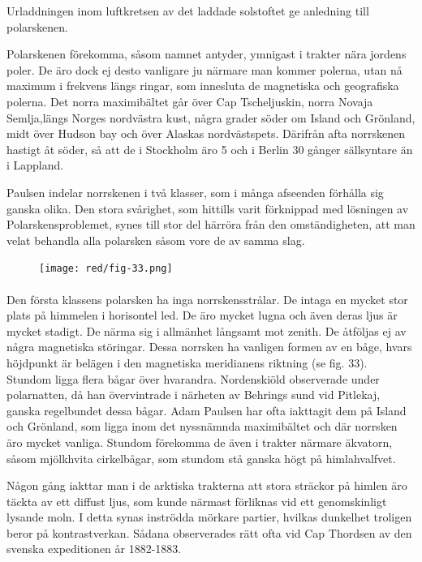 \documentclass[a4paper, 12pt, oneside, swedish]{article}
\begin{document}
Urladdningen inom luftkretsen av det laddade solstoftet ge anledning till polarskenen.

Polarskenen förekomma, såsom namnet antyder, ymnigast i trakter nära jordens poler. De äro dock ej desto vanligare ju närmare man kommer polerna, utan nå maximum i frekvens längs ringar, som innesluta de magnetiska och geografiska polerna. Det norra maximibältet går över Cap Tscheljuskin, norra Novaja Semlja,längs Norges nordvästra kust, några grader söder om Island och Grönland, midt över Hudson bay och över Alaskas nordvästspets. Därifrån afta norrskenen hastigt åt söder, så att de i Stockholm äro 5 och i Berlin 30 gånger sällsyntare än i Lappland.

Paulsen indelar norrskenen i två klasser, som i många afseenden förhålla sig ganska olika. Den stora svårighet, som hittills varit förknippad med lösningen av Polarskensproblemet, synes till stor del härröra från den omständigheten, att man velat behandla alla polarsken såsom vore de av samma slag.

\begin{figure}[H]
\centering
\texttt{[image: red/fig-33.png]}
\caption{}
\end{figure}
\paragraph{}
Den första klassens polarsken ha inga norrskensstrålar. De intaga en mycket stor plats på himmelen i horisontel led. De äro mycket lugna och även deras ljus är mycket stadigt. De närma sig i allmänhet långsamt mot zenith. De åtföljas ej av några magnetiska störingar. Dessa norrsken ha vanligen formen av en båge, hvars höjdpunkt är belägen i den magnetiska meridianens riktning (se fig. 33). Stundom ligga flera bågar över hvarandra. Nordenskiöld observerade under polarnatten, då han övervintrade i närheten av Behrings sund vid Pitlekaj, ganska regelbundet dessa bågar. Adam Paulsen har ofta iakttagit dem på Island och Grönland, som ligga inom det nyssnämnda maximibältet och där norrsken äro mycket vanliga. Stundom förekomma de även i trakter närmare äkvatorn, såsom mjölkhvita cirkelbågar, som stundom stå ganska högt på himlahvalfvet.

Någon gång iakttar man i de arktiska trakterna att stora sträckor på himlen äro täckta av ett diffust ljus, som kunde närmast förliknas vid ett genomskinligt lysande moln. I detta synas inströdda mörkare partier, hvilkas dunkelhet troligen beror på kontrastverkan. Sådana observerades rätt ofta vid Cap Thordsen av den svenska expeditionen år 1882-1883.
\end{document}
